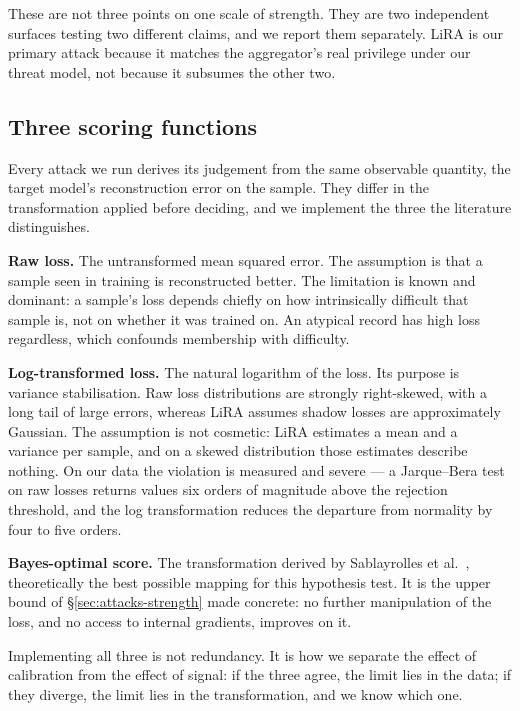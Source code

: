 These are not three points on one scale of strength. They are two independent
surfaces testing two different claims, and we report them separately. LiRA is
our primary attack because it matches the aggregator's real privilege under
our threat model, not because it subsumes the other two.

\subsection{Three scoring functions}
\label{sec:attacks-scorers}

Every attack we run derives its judgement from the same observable quantity,
the target model's reconstruction error on the sample. They differ in the
transformation applied before deciding, and we implement the three the
literature distinguishes.

\textbf{Raw loss.} The untransformed mean squared error. The assumption is
that a sample seen in training is reconstructed better. The limitation is
known and dominant: a sample's loss depends chiefly on how intrinsically
difficult that sample is, not on whether it was trained on. An atypical record
has high loss regardless, which confounds membership with difficulty.

\textbf{Log-transformed loss.} The natural logarithm of the loss. Its purpose
is variance stabilisation. Raw loss distributions are strongly right-skewed,
with a long tail of large errors, whereas LiRA assumes shadow losses are
approximately Gaussian. The assumption is not cosmetic: LiRA estimates a mean
and a variance per sample, and on a skewed distribution those estimates
describe nothing. On our data the violation is measured and severe --- a
Jarque--Bera test on raw losses returns values six orders of magnitude above
the rejection threshold, and the log transformation reduces the departure from
normality by four to five orders.

\textbf{Bayes-optimal score.} The transformation derived by Sablayrolles et
al.~\cite{sablayrolles2019whitebox}, theoretically the best possible mapping
for this hypothesis test. It is the upper bound of
\S\ref{sec:attacks-strength} made concrete: no further manipulation of the
loss, and no access to internal gradients, improves on it.

Implementing all three is not redundancy. It is how we separate the effect of
calibration from the effect of signal: if the three agree, the limit lies in
the data; if they diverge, the limit lies in the transformation, and we know
which one.

